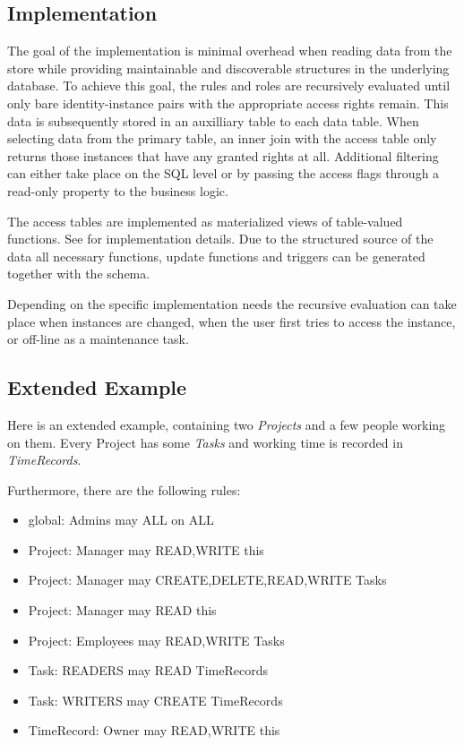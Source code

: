 \subsection{Implementation}

The goal of the implementation is minimal overhead when reading data from the
store while providing maintainable and discoverable structures in the underlying
database. To achieve this goal, the rules and roles are recursively evaluated
until only bare identity-instance pairs with the appropriate access rights
remain. This data is subsequently stored in an auxilliary table to each data
table. When selecting data from the primary table, an inner join with the access
table only returns those instances that have any granted rights at all.
Additional filtering can either take place on the SQL level or by passing the
access flags through a read-only property to the business logic.

The access tables are implemented as materialized views of table-valued
functions. See \cite{MatViewsWork} for implementation details. Due to the
structured source of the data all necessary functions, update functions and
triggers can be generated together with the schema. 

Depending on the specific implementation needs the recursive evaluation can take
place when instances are changed, when the user first tries to access the
instance, or off-line as a maintenance task.

\subsection{Extended Example}

Here is an extended example, containing two \emph{Projects} and a few people
working on them. Every Project has some \emph{Tasks} and working time is
recorded in \emph{TimeRecords}.

Furthermore, there are the following rules:

\begin{itemize}

\item{global: Admins may ALL on ALL}

\item{Project: Manager may READ,WRITE this}
\item{Project: Manager may CREATE,DELETE,READ,WRITE Tasks}
\item{Project: Manager may READ this}
\item{Project: Employees may READ,WRITE Tasks}

\item{Task: READERS may READ TimeRecords}
\item{Task: WRITERS may CREATE TimeRecords}

\item{TimeRecord: Owner may READ,WRITE this}

\end{itemize}

